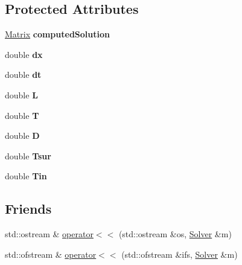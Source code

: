 \subsection*{Protected Attributes}
\begin{DoxyCompactItemize}
\item 
\mbox{\label{classSolver_ad285fd7443e4e351a36e0374f75aae40}} 
\mbox{\hyperlink{classMatrix}{Matrix}} {\bfseries computed\+Solution}
\item 
\mbox{\label{classSolver_a52a573400ef79611f2b7cf28e0a101ac}} 
double {\bfseries dx}
\item 
\mbox{\label{classSolver_add4f87d630ba162d042c38bbd2071a5e}} 
double {\bfseries dt}
\item 
\mbox{\label{classSolver_aaec7e1f0fa5c1d47cfdd3be5f46b7231}} 
double {\bfseries L}
\item 
\mbox{\label{classSolver_a145423c9810eb983e0c552de788eb6ee}} 
double {\bfseries T}
\item 
\mbox{\label{classSolver_a07bee3fa3c48992895602311bc4efc5f}} 
double {\bfseries D}
\item 
\mbox{\label{classSolver_a139886772d32d2f631d55e4775361f7a}} 
double {\bfseries Tsur}
\item 
\mbox{\label{classSolver_a3e3203f9617b2de149b6b0a5490ea181}} 
double {\bfseries Tin}
\end{DoxyCompactItemize}
\subsection*{Friends}
\begin{DoxyCompactItemize}
\item 
std\+::ostream \& \mbox{\hyperlink{classSolver_a6971051b04802402e5cbf2fda5041041}{operator$<$$<$}} (std\+::ostream \&os, \mbox{\hyperlink{classSolver}{Solver}} \&m)
\item 
std\+::ofstream \& \mbox{\hyperlink{classSolver_a1771538d8a3459fdfb2cc37729141e22}{operator$<$$<$}} (std\+::ofstream \&ifs, \mbox{\hyperlink{classSolver}{Solver}} \&m)
\end{DoxyCompactItemize}


